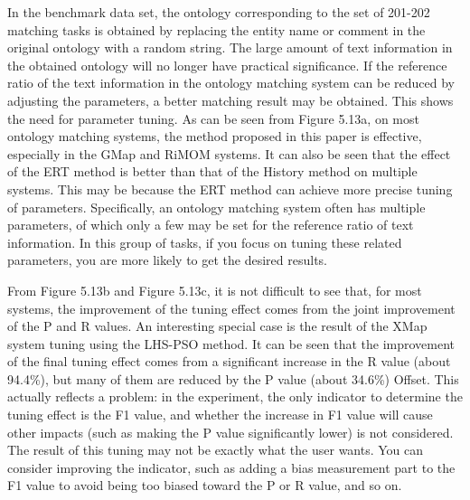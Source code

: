\documentclass[twoside]{article}
\begin{document}
In the benchmark data set, the ontology corresponding to the set of 201-202 matching tasks is obtained by replacing the entity name or comment in the original ontology with a random string. The large amount of text information in the obtained ontology will no longer have practical significance.
If the reference ratio of the text information in the ontology matching system can be reduced by adjusting the parameters, a better matching result may be obtained.
This shows the need for parameter tuning.
As can be seen from Figure 5.13a, on most ontology matching systems, the method proposed in this paper is effective, especially in the GMap and RiMOM systems.
It can also be seen that the effect of the ERT method is better than that of the History method on multiple systems. This may be because the ERT method can achieve more precise tuning of parameters.
Specifically, an ontology matching system often has multiple parameters, of which only a few may be set for the reference ratio of text information. In this group of tasks, if you focus on tuning these related parameters, you are more likely to get the desired results.

From Figure 5.13b and Figure 5.13c, it is not difficult to see that, for most systems, the improvement of the tuning effect comes from the joint improvement of the P and R values.
An interesting special case is the result of the XMap system tuning using the LHS-PSO method. It can be seen that the improvement of the final tuning effect comes from a significant increase in the R value (about 94.4\%), but many of them are reduced by the P value (about 34.6\%) Offset.
This actually reflects a problem: in the experiment, the only indicator to determine the tuning effect is the F1 value, and whether the increase in F1 value will cause other impacts (such as making the P value significantly lower) is not considered. The result of this tuning may not be exactly what the user wants.
You can consider improving the indicator, such as adding a bias measurement part to the F1 value to avoid being too biased toward the P or R value, and so on.
\end{document}
